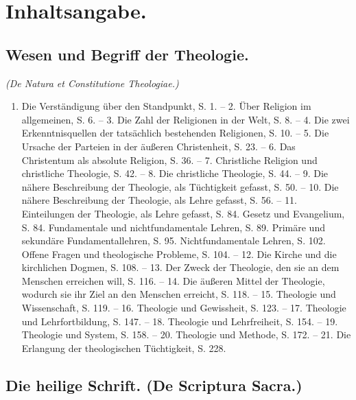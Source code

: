 \section*{Inhaltsangabe.}

\subsection*{Wesen und Begriff der Theologie.}
\emph{(De Natura et Constitutione Theologiae.)}

\begin{enumerate}
    \item Die Verständigung über den Standpunkt, S. 1. -- 2. Über Religion im allgemeinen, S. 6. -- 3. Die Zahl der Religionen in der Welt, S. 8. -- 4. Die zwei Erkenntnisquellen der tatsächlich bestehenden Religionen, S. 10. -- 5. Die Ursache der Parteien in der äußeren Christenheit, S. 23. -- 6. Das Christentum als absolute Religion, S. 36. -- 7. Christliche Religion und christliche Theologie, S. 42. -- 8. Die christliche Theologie, S. 44. -- 9. Die nähere Beschreibung der Theologie, als Tüchtigkeit gefasst, S. 50. -- 10. Die nähere Beschreibung der Theologie, als Lehre gefasst, S. 56. -- 11. Einteilungen der Theologie, als Lehre gefasst, S. 84. Gesetz und Evangelium, S. 84. Fundamentale und nichtfundamentale Lehren, S. 89. Primäre und sekundäre Fundamentallehren, S. 95. Nichtfundamentale Lehren, S. 102. Offene Fragen und theologische Probleme, S. 104. -- 12. Die Kirche und die kirchlichen Dogmen, S. 108. -- 13. Der Zweck der Theologie, den sie an dem Menschen erreichen will, S. 116. -- 14. Die äußeren Mittel der Theologie, wodurch sie ihr Ziel an den Menschen erreicht, S. 118. -- 15. Theologie und Wissenschaft, S. 119. -- 16. Theologie und Gewissheit, S. 123. -- 17. Theologie und Lehrfortbildung, S. 147. -- 18. Theologie und Lehrfreiheit, S. 154. -- 19. Theologie und System, S. 158. -- 20. Theologie und Methode, S. 172. -- 21. Die Erlangung der theologischen Tüchtigkeit, S. 228.
\end{enumerate}

\subsection*{Die heilige Schrift. (De Scriptura Sacra.)}

